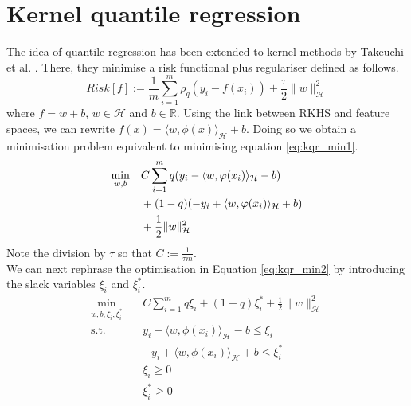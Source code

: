 \section{Kernel quantile regression}
The idea of quantile regression has been extended to kernel methods by Takeuchi et al. \cite{takeuchi2006nonparametric}.
There, they minimise a risk functional plus regulariser defined as follows.
\begin{equation}\label{eq:kqr_min1}
    Risk[f]:=\frac{1}{m}\sum\limits_{i=1}^{m}\rho_q(y_i-f(x_i))+\frac{\tau}{2}\|w\|_\mathcal{H}^2
\end{equation}
where $f=w+b$, $w \in \mathcal{H}$ and $b \in \mathbb{R}$.
Using the link between RKHS and feature spaces, we can rewrite $f(x)=\langle w, \phi(x) \rangle_{\mathcal{H}}+b$. 
 Doing so we obtain a minimisation problem equivalent to minimising equation \ref{eq:kqr_min1}.
\begin{equation}\label{eq:kqr_min2}
    \begin{split}
        \min_{w,b} \quad & C \sum \limits_{i=1}^{m} \hbox{$q(y_i - \langle w, \phi(x_i) \rangle_{\mathcal{H}} - b)$} \\
        & + \hbox{$(1-q)(-y_i + \langle w, \phi(x_i) \rangle_{\mathcal{H}} + b)$} \\
        & + \frac{1}{2}\|w\|_{\mathcal{H}}^2
    \end{split}
    \end{equation}
Note the division by $\tau$ so that $C:=\frac{1}{\tau m}$.
\\
We can next rephrase the optimisation in Equation \ref{eq:kqr_min2} by introducing the slack variables $\xi_i$ and $\xi_i^*$.
\begin{equation}\label{eq:kqr_min3}
    \begin{aligned}
        \min_{w,b,\xi_i,\xi_i^*} \quad & C \sum \limits_{i=1}^{m}
        q \xi_i+ (1-q)\xi_i^*+ \frac{1}{2}\|w\|_{\mathcal{H}}^2\\
    \textrm{s.t.} \quad & y_i-\langle w, \phi(x_i) \rangle_{\mathcal{H}}-b \leq \xi_i\\
    & -y_i+\langle w, \phi(x_i) \rangle_{\mathcal{H}}+b \leq \xi_i^*\\
      &\xi_i\geq0    \\
      &\xi_i^*\geq0    \\
    \end{aligned}
    \end{equation}
